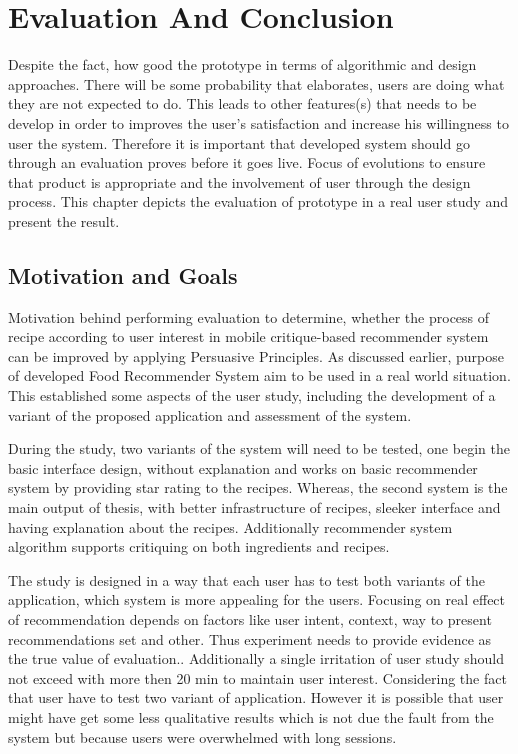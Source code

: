 \chapter{Evaluation And Conclusion}

Despite the fact, how good the prototype in terms of algorithmic and design approaches. There will be some probability that elaborates, users are doing what they are not expected to do.  This leads to other features(s) that needs to be develop in order to improves the user’s satisfaction and increase his willingness to user the system. Therefore it is important that developed system should go through an evaluation proves before it goes live. Focus of evolutions to ensure that product is appropriate and the involvement of user through the design process. This chapter depicts the evaluation of prototype in a real user study and present the result.

\section{Motivation and Goals}

Motivation behind performing evaluation to determine, whether the process of recipe according to user interest in mobile critique-based recommender system can be improved by applying Persuasive Principles. As discussed earlier, purpose of developed Food Recommender System aim to be used in a real world situation. This established some aspects of the user study, including the development of a variant of the proposed application and assessment of the system.\newline

During the study, two variants of the system will need to be tested, one begin the basic interface design, without explanation and works on basic recommender system by providing star rating to the recipes. Whereas, the second system is the main output of thesis, with better infrastructure of recipes, sleeker interface and having explanation about the recipes. Additionally recommender system algorithm supports critiquing on both ingredients and recipes.\newline 

The study is designed in a way that each user has to test both variants of the application, which system is more appealing for the users. Focusing on real effect of recommendation depends on factors like user intent, context, way to present recommendations set and other. Thus experiment needs to provide evidence as the true value of evaluation.\cite{shani2011evaluating}. Additionally a single irritation of user study should not exceed with more then 20 min to maintain user interest. Considering the fact that user have to test two variant of application. However it is possible that user might have get some less qualitative results which is not due the fault from the system but because users were overwhelmed with long sessions.  \newline

